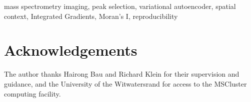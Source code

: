 \documentclass[journal,10pt,twoside]{IEEEtran}
\begin{document}
\begin{IEEEkeywords}
mass spectrometry imaging, peak selection, variational autoencoder, spatial context, Integrated Gradients, Moran's I, reproducibility
\end{IEEEkeywords}









\section*{Acknowledgements}
The author thanks Hairong Bau and Richard Klein for their supervision and
guidance, and the University of the Witwatersrand for access to the MSCluster
computing facility.

\balance


\appendices

\end{document}
